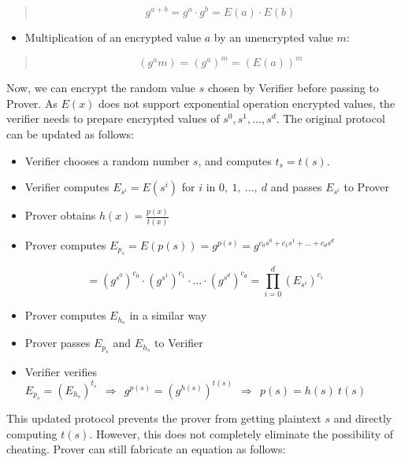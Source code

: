 \documentclass[
]{report}
\providecommand{\tightlist}{%
  \setlength{\itemsep}{0pt}\setlength{\parskip}{0pt}}
\begin{document}
\begin{quote}
\[g^{a + b} = g^{a} \cdot g^{b} = E(a) \cdot E(b)\]
\end{quote}

\begin{itemize}
\tightlist
\item
  Multiplication of an encrypted value \(a\) by an unencrypted value
  \(m\):
\end{itemize}

\begin{quote}
\[\left( g^{a}m \right) = \left( g^{a} \right)^{m} = \left( E(a) \right)^{m}\]
\end{quote}

Now, we can encrypt the random value \(s\) chosen by Verifier before
passing to Prover. As \(E(x)\) does not support exponential operation
encrypted values, the verifier needs to prepare encrypted values of
\(s^{0},s^{1},\ldots,s^{d}\). The original protocol can be updated as
follows:

\begin{itemize}
\item
  Verifier chooses a random number \(s\), and computes \(t_{s} = t(s)\).
\item
  Verifier computes \(E_{s^{i}} = E\left( s^{i} \right)\) for \(i\) in
  \(0,\ 1,\ \ldots,\ d\) and passes \(E_{s^{i}}\) to Prover
\item
  Prover obtains \(h(x) = \frac{p(x)}{t(x)}\)
\item
  Prover computes
  \(E_{p_{s}} = E\left( p(s) \right) = g^{p(s)} = g^{c_{0}s^{0} + c_{1}s^{1} + \ldots + c_{d}s^{d}}\)
\end{itemize}

\[= \left( g^{s^{0}} \right)^{c_{0}} \cdot \left( g^{s^{1}} \right)^{c_{1}} \cdot \ldots \cdot \left( g^{s^{d}} \right)^{c_{d}} = \prod_{i = 0}^{d}\left( E_{s^{i}} \right)^{c_{i}}\]

\begin{itemize}
\item
  Prover computes \(E_{h_{s}}\) in a similar way
\item
  Prover passes \(E_{p_{s}}\) and \(E_{h_{s}}\) to Verifier
\item
  Verifier verifies
  \(E_{p_{s}} = \left( E_{h_{s}} \right)^{t_{s}}\mathbf{\ \  \Rightarrow \ \ }g^{p(s)} = \left( g^{h(s)} \right)^{t(s)}\mathbf{\ \  \Rightarrow \ \ }p(s) = h(s)\ t(s)\)
\end{itemize}

This updated protocol prevents the prover from getting plaintext \(s\)
and directly computing \(t(s)\). However, this does not completely
eliminate the possibility of cheating. Prover can still fabricate an
equation as follows:
\end{document}

